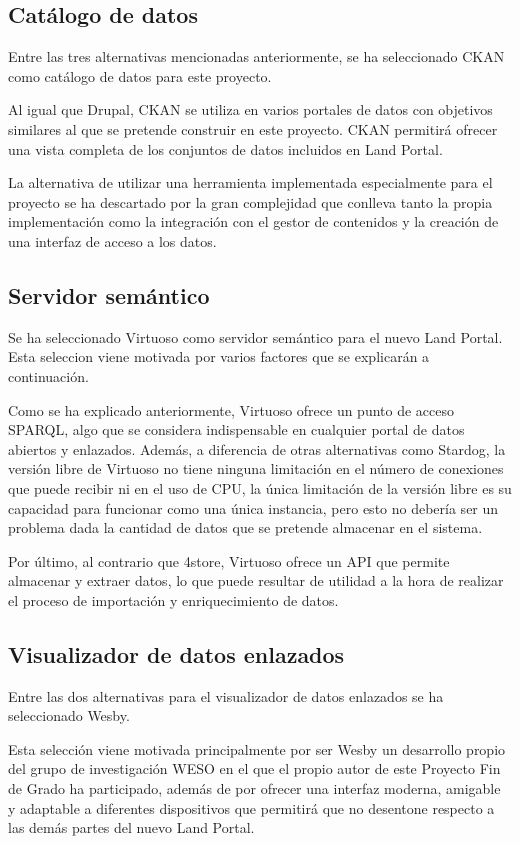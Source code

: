 \subsection{Catálogo de datos}
Entre las tres alternativas mencionadas anteriormente, se ha seleccionado CKAN como catálogo de datos para este proyecto.

Al igual que Drupal, CKAN se utiliza en varios portales de datos con objetivos similares al que se pretende construir en este proyecto. CKAN permitirá ofrecer una vista completa de los conjuntos de datos incluidos en Land Portal.

La alternativa de utilizar una herramienta implementada especialmente para el proyecto se ha descartado por la gran complejidad que conlleva tanto la propia implementación como la integración con el gestor de contenidos y la creación de una interfaz de acceso a los datos.


\subsection{Servidor semántico}
Se ha seleccionado Virtuoso como servidor semántico para el nuevo Land Portal. Esta seleccion viene motivada por varios factores que se explicarán a continuación.

Como se ha explicado anteriormente, Virtuoso ofrece un punto de acceso SPARQL, algo que se considera indispensable en cualquier portal de datos abiertos y enlazados.  Además, a diferencia de otras alternativas como Stardog, la versión libre de Virtuoso no tiene ninguna limitación en el número de conexiones que puede recibir ni en el uso de CPU, la única limitación de la versión libre es su capacidad para funcionar como una única instancia, pero esto no debería ser un problema dada la cantidad de datos que se pretende almacenar en el sistema.

Por último, al contrario que 4store, Virtuoso ofrece un API que permite almacenar y extraer datos, lo que puede resultar de utilidad a la hora de realizar el proceso de importación y enriquecimiento de datos.


\subsection{Visualizador de datos enlazados}
Entre las dos alternativas para el visualizador de datos enlazados se ha seleccionado Wesby.

Esta selección viene motivada principalmente por ser Wesby un desarrollo propio del grupo de investigación WESO en el que el propio autor de este Proyecto Fin de Grado ha participado, además de por ofrecer una interfaz moderna, amigable y adaptable a diferentes dispositivos que permitirá que no desentone respecto a las demás partes del nuevo Land Portal.


